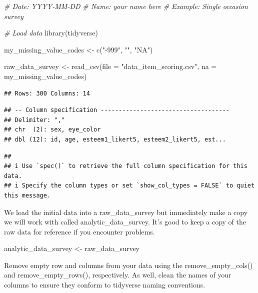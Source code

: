 \documentclass[
]{krantz}
\makeatletter
\newenvironment{Shaded}{\begin{snugshade}}{\end{snugshade}}
\newcommand{\AttributeTok}[1]{\textcolor[rgb]{0.61,0.61,0.61}{#1}}
\newcommand{\CommentTok}[1]{\textcolor[rgb]{0.37,0.37,0.37}{\textit{#1}}}
\newcommand{\FunctionTok}[1]{\textcolor[rgb]{0,0,0}{#1}}
\newcommand{\NormalTok}[1]{#1}
\newcommand{\OtherTok}[1]{\textcolor[rgb]{0.37,0.37,0.37}{#1}}
\newcommand{\StringTok}[1]{\textcolor[rgb]{0.5,0.5,0.5}{#1}}
\newenvironment{kframe}{%
\medskip{}
\setlength{\fboxsep}{.8em}
 \def\at@end@of@kframe{}%
 \ifinner\ifhmode%
  \def\at@end@of@kframe{\end{minipage}}%
  \begin{minipage}{\columnwidth}%
 \fi\fi%
 \def\FrameCommand##1{\hskip\@totalleftmargin \hskip-\fboxsep
 \colorbox{shadecolor}{##1}\hskip-\fboxsep
     \hskip-\linewidth \hskip-\@totalleftmargin \hskip\columnwidth}%
 \MakeFramed {\advance\hsize-\width
   \@totalleftmargin\z@ \linewidth\hsize
   \@setminipage}}%
 {\par\unskip\endMakeFramed%
 \at@end@of@kframe}
\renewenvironment{Shaded}{\begin{kframe}}{\end{kframe}}
\makeatother
\begin{document}
\begin{Shaded}
\begin{Highlighting}[]
\CommentTok{\# Date: YYYY{-}MM{-}DD}
\CommentTok{\# Name: your name here}
\CommentTok{\# Example: Single occasion survey}

\CommentTok{\# Load data}
\FunctionTok{library}\NormalTok{(tidyverse)}

\NormalTok{my\_missing\_value\_codes }\OtherTok{\textless{}{-}} \FunctionTok{c}\NormalTok{(}\StringTok{"{-}999"}\NormalTok{, }\StringTok{""}\NormalTok{, }\StringTok{"NA"}\NormalTok{)}

\NormalTok{raw\_data\_survey }\OtherTok{\textless{}{-}} \FunctionTok{read\_csv}\NormalTok{(}\AttributeTok{file =} \StringTok{"data\_item\_scoring.csv"}\NormalTok{,}
                     \AttributeTok{na =}\NormalTok{ my\_missing\_value\_codes)}
\end{Highlighting}
\end{Shaded}

\begin{verbatim}
## Rows: 300 Columns: 14
\end{verbatim}

\begin{verbatim}
## -- Column specification ------------------------------------
## Delimiter: ","
## chr  (2): sex, eye_color
## dbl (12): id, age, esteem1_likert5, esteem2_likert5, est...
\end{verbatim}

\begin{verbatim}
## 
## i Use `spec()` to retrieve the full column specification for this data.
## i Specify the column types or set `show_col_types = FALSE` to quiet this message.
\end{verbatim}

We load the initial data into a raw\_data\_survey but immediately make a copy we will work with called analytic\_data\_survey. It's good to keep a copy of the raw data for reference if you encounter problems.

\begin{Shaded}
\begin{Highlighting}[]
\NormalTok{analytic\_data\_survey }\OtherTok{\textless{}{-}}\NormalTok{ raw\_data\_survey}
\end{Highlighting}
\end{Shaded}

Remove empty row and columns from your data using the remove\_empty\_cols() and remove\_empty\_rows(), respectively. As well, clean the names of your columns to ensure they conform to tidyverse naming conventions.
\end{document}
